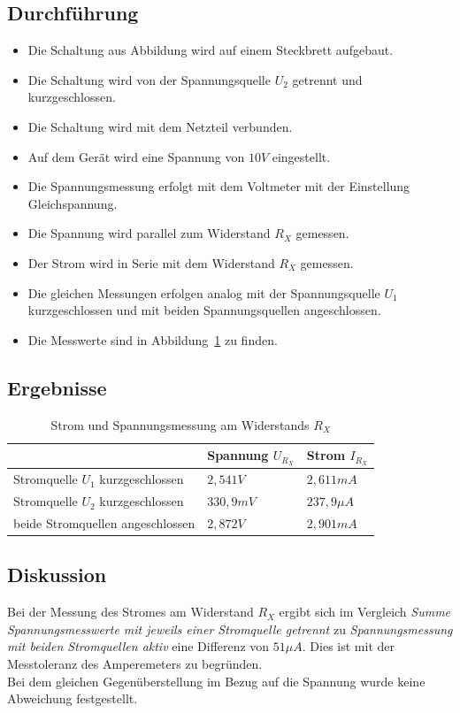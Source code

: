 \documentclass[12pt,a4paper,titlepage]{article}
\begin{document}
\subsection{Durchf\"uhrung}
\begin{itemize}
  \item Die Schaltung aus Abbildung wird auf einem Steckbrett aufgebaut.
  \item Die Schaltung wird von der Spannungsquelle $U_2$ getrennt und kurzgeschlossen.
  \item Die Schaltung wird mit dem Netzteil verbunden.
  \item Auf dem Ger\"at wird eine Spannung von $10 V$ eingestellt.
  \item Die Spannungsmessung erfolgt mit dem Voltmeter mit der Einstellung Gleichspannung.
  \item Die Spannung wird parallel zum Widerstand $R_X$ gemessen.
  \item Der Strom wird in Serie mit dem Widerstand $R_X$ gemessen.
  \item Die gleichen Messungen erfolgen analog mit der Spannungsquelle $U_1$ kurzgeschlossen und mit beiden Spannungsquellen angeschlossen.
  \item Die Messwerte sind in Abbildung~\ref{Figure4.4.5} zu finden.
\end{itemize}

\subsection{Ergebnisse}
\begin{table}[H]
\centering
\begin{tabular}{|l|l|l|}
\hline
                                 & Spannung $U_{R_X}$ & Strom $I_{R_X}$      \\ \hline
Stromquelle $U_1$ kurzgeschlossen & $2,541 V$    & $2,611 mA$     \\ \hline
Stromquelle $U_2$ kurzgeschlossen & $330,9 mV$   & $237,9 \mu A$ \\ \hline
beide Stromquellen angeschlossen  & $2,872 V$    & $2,901 mA$ \\ \hline
\end{tabular}
\caption{Strom und Spannungsmessung am Widerstands $R_X$}
\label{Figure4.4.5}
\end{table}

\subsection{Diskussion}
Bei der Messung des Stromes am Widerstand $R_X$ ergibt sich im Vergleich \textit{Summe Spannungsmesswerte mit jeweils einer Stromquelle getrennt} zu \textit{Spannungsmessung mit beiden Stromquellen aktiv} eine Differenz von $51 \mu A$. Dies ist mit der Messtoleranz des Amperemeters zu begr\"unden. \\
Bei dem gleichen Gegen\"uberstellung im Bezug auf die Spannung wurde keine Abweichung festgestellt.
\end{document}
